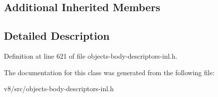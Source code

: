 \subsection*{Additional Inherited Members}


\subsection{Detailed Description}


Definition at line 621 of file objects-\/body-\/descriptors-\/inl.\+h.



The documentation for this class was generated from the following file\+:\begin{DoxyCompactItemize}
\item 
v8/src/objects-\/body-\/descriptors-\/inl.\+h\end{DoxyCompactItemize}
